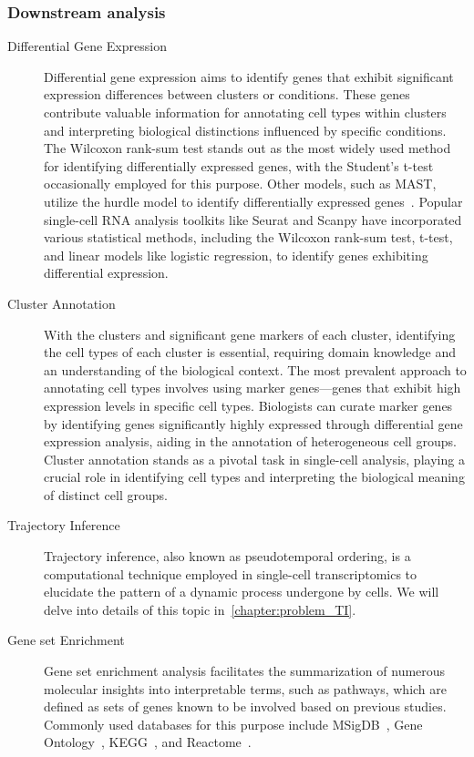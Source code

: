\subsubsection{Downstream analysis}
\begin{description}
	\item[Differential Gene Expression]
	Differential gene expression aims to identify genes that exhibit significant expression differences between clusters or conditions. These genes contribute valuable information for annotating cell types within clusters and interpreting biological distinctions influenced by specific conditions. The Wilcoxon rank-sum test stands out as the most widely used method for identifying differentially expressed genes, with the Student's t-test occasionally employed for this purpose. Other models, such as MAST, utilize the hurdle model to identify differentially expressed genes~\citep{finak2015mast}. Popular single-cell RNA analysis toolkits like Seurat and Scanpy have incorporated various statistical methods, including the Wilcoxon rank-sum test, t-test, and linear models like logistic regression, to identify genes exhibiting differential expression.

	\item[Cluster Annotation]
	With the clusters and significant gene markers of each cluster, identifying the cell types of each cluster is essential, requiring domain knowledge and an understanding of the biological context. The most prevalent approach to annotating cell types involves using marker genes—genes that exhibit high expression levels in specific cell types. Biologists can curate marker genes by identifying genes significantly highly expressed through differential gene expression analysis, aiding in the annotation of heterogeneous cell groups. Cluster annotation stands as a pivotal task in single-cell analysis, playing a crucial role in identifying cell types and interpreting the biological meaning of distinct cell groups.

	\item[Trajectory Inference]
	Trajectory inference, also known as pseudotemporal ordering, is a computational technique employed in single-cell transcriptomics to elucidate the pattern of a dynamic process undergone by cells. We will delve into details of this topic in~\cref{chapter:problem_TI}.

	\item[Gene set Enrichment]
	Gene set enrichment analysis facilitates the summarization of numerous molecular insights into interpretable terms, such as pathways, which are defined as sets of genes known to be involved based on previous studies. Commonly used databases for this purpose include MSigDB~\citep{liberzon2011msigdb}, Gene Ontology~\citep{gene2004go}, KEGG~\citep{kanehisa2007kegg}, and Reactome~\citep{fabregat2018reactome}.
\end{description}

